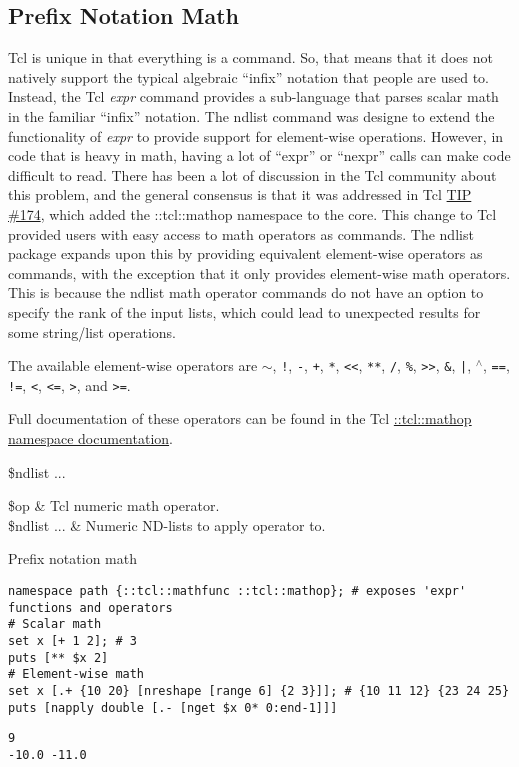 \clearpage
\subsection{Prefix Notation Math}
Tcl is unique in that everything is a command. So, that means that it does not natively support the typical algebraic ``infix'' notation that people are used to. 
Instead, the Tcl \textit{expr} command provides a sub-language that parses scalar math in the familiar ``infix'' notation.
The ndlist  command was designe to extend the functionality of \textit{expr} to provide support for element-wise operations. 
However, in code that is heavy in math, having a lot of ``expr'' or ``nexpr'' calls can make code difficult to read.
There has been a lot of discussion in the Tcl community about this problem, and the general consensus is that it was addressed in Tcl \hyperlink{https://core.tcl-lang.org/tips/doc/trunk/tip/174.md}{TIP \#174}, which added the ::tcl::mathop namespace to the core. 
This change to Tcl provided users with easy access to math operators as commands.
The ndlist package expands upon this by providing equivalent element-wise operators as commands, with the exception that it only provides element-wise math operators. 
This is because the ndlist math operator commands do not have an option to specify the rank of the input lists, which could lead to unexpected results for some string/list operations.

The available element-wise operators are \texttt{$\sim$}, \texttt{!}, \texttt{-}, \texttt{+}, \texttt{*}, \texttt{<{}<}, \texttt{**}, \texttt{/}, \texttt{\%}, \texttt{>{}>}, \texttt{\&}, \texttt{|}, \texttt{$^\wedge$}, \texttt{==}, \texttt{!=}, \texttt{<}, \texttt{<=}, \texttt{>}, and \texttt{>=}. 

Full documentation of these operators can be found in the Tcl \hyperlink{https://www.tcl-lang.org/man/tcl/TclCmd/mathop.htm}{::tcl::mathop namespace documentation}.

\begin{syntax}
 \$ndlist ...
\end{syntax}
\begin{args}
\$op & Tcl numeric math operator. \\
\$ndlist ... & Numeric ND-lists to apply operator to.
\end{args}

\begin{example}{Prefix notation math}
\begin{lstlisting}
namespace path {::tcl::mathfunc ::tcl::mathop}; # exposes 'expr' functions and operators
# Scalar math
set x [+ 1 2]; # 3
puts [** $x 2]
# Element-wise math
set x [.+ {10 20} [nreshape [range 6] {2 3}]]; # {10 11 12} {23 24 25}
puts [napply double [.- [nget $x 0* 0:end-1]]]
\end{lstlisting}
\tcblower
\begin{lstlisting}
9
-10.0 -11.0
\end{lstlisting}
\end{example}

\clearpage